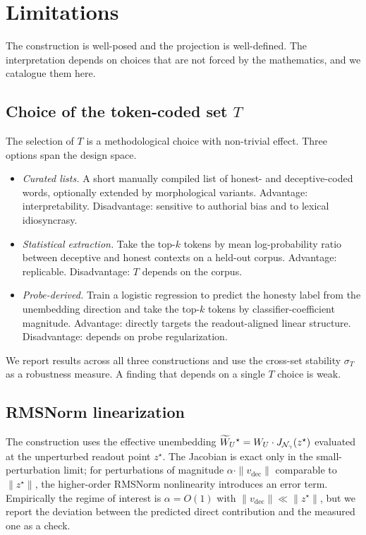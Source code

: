 \documentclass[11pt,letterpaper]{article}
\theoremstyle{plain}
\theoremstyle{definition}
\newcommand{\1}{\mathbf{1}}
\newcommand{\WU}{W_{U}\mathchoice{}{}{}{}}
\newcommand{\WUt}{\widetilde{W}_{U}\mathchoice{}{}{}{}}
\newcommand{\vdec}{v_{\text{dec}}}
\begin{document}
\section{Limitations}\label{sec:limitations}

The construction is well-posed and the projection is well-defined. The interpretation depends on choices that are not forced by the mathematics, and we catalogue them here.

\subsection{Choice of the token-coded set $T$}

The selection of $T$ is a methodological choice with non-trivial effect. Three options span the design space.
\begin{itemize}[leftmargin=*]
\item \emph{Curated lists.} A short manually compiled list of honest- and deceptive-coded words, optionally extended by morphological variants. Advantage: interpretability. Disadvantage: sensitive to authorial bias and to lexical idiosyncrasy.
\item \emph{Statistical extraction.} Take the top-$k$ tokens by mean log-probability ratio between deceptive and honest contexts on a held-out corpus. Advantage: replicable. Disadvantage: $T$ depends on the corpus.
\item \emph{Probe-derived.} Train a logistic regression to predict the honesty label from the unembedding direction and take the top-$k$ tokens by classifier-coefficient magnitude. Advantage: directly targets the readout-aligned linear structure. Disadvantage: depends on probe regularization.
\end{itemize}

We report results across all three constructions and use the cross-set stability $\sigma_T$ as a robustness measure. A finding that depends on a single $T$ choice is weak.

\subsection{RMSNorm linearization}

The construction uses the effective unembedding $\WUt^\star = \WU \cdot J_{\mathcal{N}_\gamma}(z^\star)$ evaluated at the unperturbed readout point $z^\star$. The Jacobian is exact only in the small-perturbation limit; for perturbations of magnitude $\alpha \cdot \|\vdec\|$ comparable to $\|z^\star\|$, the higher-order RMSNorm nonlinearity introduces an error term. Empirically the regime of interest is $\alpha = O(1)$ with $\|\vdec\| \ll \|z^\star\|$, but we report the deviation between the predicted direct contribution and the measured one as a check.
\end{document}
